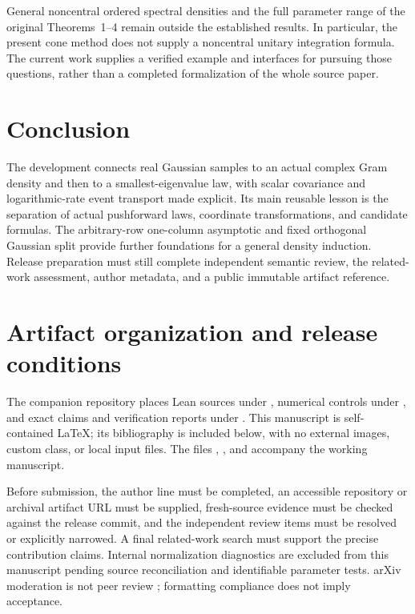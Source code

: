 \documentclass[11pt]{article}
\begin{document}
General noncentral ordered spectral densities and the full parameter range of
the original Theorems~1--4 remain outside the established results. In
particular, the present cone method does not supply a noncentral unitary
integration formula. The current work supplies a verified example and
interfaces for pursuing those questions, rather than a completed
formalization of the whole source paper.

\section{Conclusion}
The development connects real Gaussian samples to an actual complex Gram
density and then to a smallest-eigenvalue law, with scalar covariance and
logarithmic-rate event transport made explicit. Its main reusable lesson is
the separation of actual pushforward laws, coordinate transformations, and
candidate formulas. The arbitrary-row one-column asymptotic and fixed
orthogonal Gaussian split provide further foundations for a general density
induction. Release preparation must still complete independent semantic
review, the related-work assessment, author metadata, and a public immutable
artifact reference.

\appendix
\section{Artifact organization and release conditions}
The companion repository places Lean sources under
, numerical controls under
, and exact claims and verification reports under
. This manuscript is self-contained LaTeX; its bibliography
is included below, with no external images, custom class, or local input files.
The files , , and
 accompany the working manuscript.

Before submission, the author line must be completed, an accessible repository
or archival artifact URL must be supplied, fresh-source evidence must be
checked against the release commit, and the independent review items must be
resolved or explicitly narrowed. A final related-work search must support
the precise contribution claims. Internal normalization diagnostics are excluded
from this manuscript pending source reconciliation and identifiable parameter
tests. arXiv moderation is not peer review
\cite{arxivpolicy}; formatting compliance does not imply acceptance.
\end{document}
